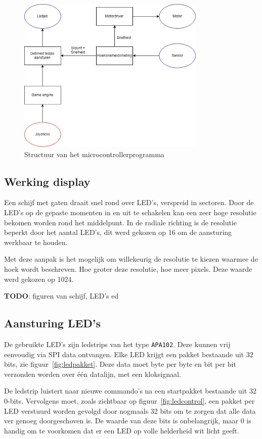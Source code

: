 \documentclass[a4paper, 12pt]{article}
\newcommand{\TODO}{\large\textbf{TODO}}
\begin{document}
\begin{figure}
  \centering
  \includegraphics[width=0.8\textwidth]{afbeeldingen/structuur.jpg}
  \caption{Structuur van het microcontrollerprogramma}
  \label{fig:structuur}
\end{figure}


\subsection{Werking display}
Een schijf met gaten draait snel rond over LED's, verspreid in sectoren.
Door de LED's op de gepaste momenten in en uit te schakelen
kan een zeer hoge resolutie bekomen worden rond het middelpunt.
In de radiale richting is de resolutie beperkt door het aantal LED's,
dit werd gekozen op 16 om de aansturing werkbaar te houden.

Met deze aanpak is het mogelijk om willekeurig de resolutie te kiezen
waarmee de hoek wordt beschreven. Hoe groter deze resolutie,
hoe meer pixels. Deze waarde werd gekozen op 1024.

\TODO : figuren van schijf, LED's ed

\subsection{Aansturing LED's}
De gebruikte LED's zijn ledstrips van het type \texttt{APA102}.
Deze kunnen vrij eenvoudig via SPI data ontvangen.
Elke LED krijgt een pakket bestaande uit 32 bits, zie
figuur~\ref{fig:ledpakket}.
Deze data moet byte per byte en bit per bit verzonden worden over één datalijn,
met een kloksignaal.

De ledstrip luistert naar nieuwe commando's na een startpakket
bestaande uit 32 0-bits. Vervolgens moet,
zoals zichtbaar op figuur~\ref{fig:ledcontrol},
een pakket per LED verstuurd worden gevolgd door
nogmaals 32 bits om te zorgen dat alle data ver genoeg doorgeschoven is.
De waarde van deze bits is onbelangrijk,
maar 0 is handig om te voorkomen dat er een LED op volle helderheid wit licht geeft.
\end{document}
